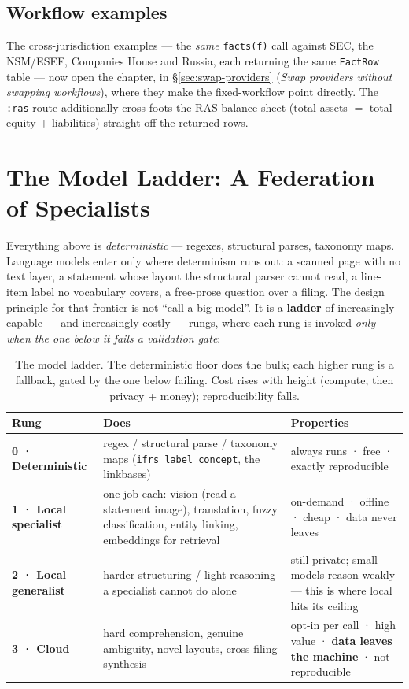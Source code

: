 \documentclass[11pt,a4paper]{report}
\begin{document}
\subsection{Workflow examples}

The cross-jurisdiction examples --- the \emph{same} \texttt{facts(f)} call against SEC, the NSM/ESEF,
Companies House and Russia, each returning the same \texttt{FactRow} table --- now open the chapter, in
\S\ref{sec:swap-providers} (\emph{Swap providers without swapping workflows}), where they make the
fixed-workflow point directly. The \texttt{:ras} route additionally cross-foots the RAS balance sheet
(total assets \(=\) total equity \(+\) liabilities) straight off the returned rows.


\section{The Model Ladder: A Federation of Specialists}
\label{sec:model-ladder}

Everything above is \emph{deterministic} --- regexes, structural parses, taxonomy maps. Language models enter
only where determinism runs out: a scanned page with no text layer, a statement whose layout the structural
parser cannot read, a line-item label no vocabulary covers, a free-prose question over a filing. The design
principle for that frontier is not ``call a big model''. It is a \textbf{ladder} of increasingly capable ---
and increasingly costly --- rungs, where each rung is invoked \emph{only when the one below it fails a
validation gate}:

\begin{table}[h]
\centering
\small
\caption{The model ladder. The deterministic floor does the bulk; each higher rung is a fallback, gated by the
one below failing. Cost rises with height (compute, then privacy + money); reproducibility falls.}
\label{tab:model-ladder}
\begin{tabular}{@{}p{}p{}p{}@{}}
\toprule
\textbf{Rung} & \textbf{Does} & \textbf{Properties} \\
\midrule
\textbf{0 · Deterministic} & regex / structural parse / taxonomy maps (\texttt{ifrs\_label\_concept}, the
  linkbases) & always runs · free · exactly reproducible \\
\textbf{1 · Local specialist} & one job each: vision (read a statement image), translation, fuzzy
  classification, entity linking, embeddings for retrieval & on-demand · offline · cheap · data never leaves \\
\textbf{2 · Local generalist} & harder structuring / light reasoning a specialist cannot do alone & still
  private; small models reason weakly --- this is where local hits its ceiling \\
\textbf{3 · Cloud} & hard comprehension, genuine ambiguity, novel layouts, cross-filing synthesis & opt-in
  per call · high value · \textbf{data leaves the machine} · not reproducible \\
\bottomrule
\end{tabular}
\end{table}
\end{document}
